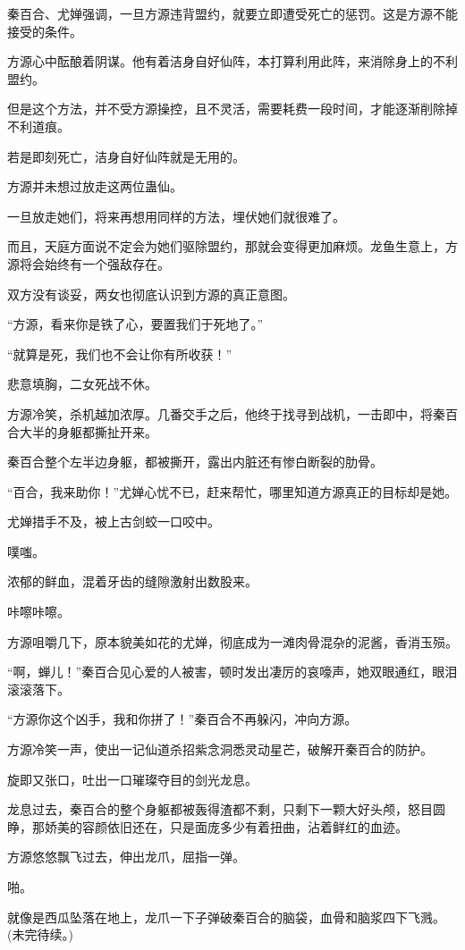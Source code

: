 \begin{this_body}
秦百合、尤婵强调，一旦方源违背盟约，就要立即遭受死亡的惩罚。这是方源不能接受的条件。

方源心中酝酿着阴谋。他有着洁身自好仙阵，本打算利用此阵，来消除身上的不利盟约。

但是这个方法，并不受方源操控，且不灵活，需要耗费一段时间，才能逐渐削除掉不利道痕。

若是即刻死亡，洁身自好仙阵就是无用的。

方源并未想过放走这两位蛊仙。

一旦放走她们，将来再想用同样的方法，埋伏她们就很难了。

而且，天庭方面说不定会为她们驱除盟约，那就会变得更加麻烦。龙鱼生意上，方源将会始终有一个强敌存在。

双方没有谈妥，两女也彻底认识到方源的真正意图。

“方源，看来你是铁了心，要置我们于死地了。”

“就算是死，我们也不会让你有所收获！”

悲意填胸，二女死战不休。

方源冷笑，杀机越加浓厚。几番交手之后，他终于找寻到战机，一击即中，将秦百合大半的身躯都撕扯开来。

秦百合整个左半边身躯，都被撕开，露出内脏还有惨白断裂的肋骨。

“百合，我来助你！”尤婵心忧不已，赶来帮忙，哪里知道方源真正的目标却是她。

尤婵措手不及，被上古剑蛟一口咬中。

噗嗤。

浓郁的鲜血，混着牙齿的缝隙激射出数股来。

咔嚓咔嚓。

方源咀嚼几下，原本貌美如花的尤婵，彻底成为一滩肉骨混杂的泥酱，香消玉殒。

“啊，蝉儿！”秦百合见心爱的人被害，顿时发出凄厉的哀嚎声，她双眼通红，眼泪滚滚落下。

“方源你这个凶手，我和你拼了！”秦百合不再躲闪，冲向方源。

方源冷笑一声，使出一记仙道杀招紫念洞悉灵动星芒，破解开秦百合的防护。

旋即又张口，吐出一口璀璨夺目的剑光龙息。

龙息过去，秦百合的整个身躯都被轰得渣都不剩，只剩下一颗大好头颅，怒目圆睁，那娇美的容颜依旧还在，只是面庞多少有着扭曲，沾着鲜红的血迹。

方源悠悠飘飞过去，伸出龙爪，屈指一弹。

啪。

就像是西瓜坠落在地上，龙爪一下子弹破秦百合的脑袋，血骨和脑浆四下飞溅。(未完待续。)

\end{this_body}

